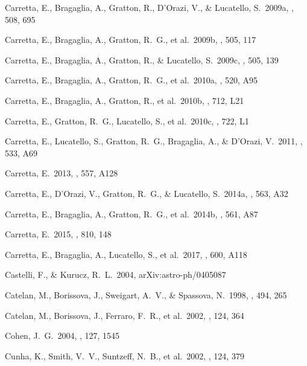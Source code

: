 \documentclass[12pt,preprint]{emulateapj}
\begin{document}
\begin{thebibliography}{}
 Carretta, E., Bragaglia, A., Gratton, R., D'Orazi, V., \& Lucatello, S.\ 2009a, \aap, 508, 695

 Carretta, E., Bragaglia, A., Gratton, R.~G., et al.\ 2009b, \aap, 505, 117

 Carretta, E., Bragaglia, A., Gratton, R., \& Lucatello, S.\ 2009c, \aap, 505, 139

 Carretta, E., Bragaglia, A., Gratton, R.~G., et al.\ 2010a, \aap, 520, A95

 Carretta, E., Bragaglia, A., Gratton, R., et al.\ 2010b, \apjl, 712, L21

 Carretta, E., Gratton, R.~G., Lucatello, S., et al.\ 2010c, \apjl, 722, L1 

 Carretta, E., Lucatello, S., Gratton, R.~G., Bragaglia, A., \& D'Orazi, V.\ 2011, \aap, 533, A69

 Carretta, E.\ 2013, \aap, 557, A128

 Carretta, E., D'Orazi, V., Gratton, R.~G., \& Lucatello, S.\ 2014a, \aap, 563, A32

 Carretta, E., Bragaglia, A., Gratton, R.~G., et al.\ 2014b, \aap, 561, A87

 Carretta, E.\ 2015, \apj, 810, 148

 Carretta, E., Bragaglia, A., Lucatello, S., et al.\ 2017, \aap, 600, A118

 Castelli, F., \& Kurucz, R.~L.\ 2004, arXiv:astro-ph/0405087

 Catelan, M., Borissova, J., Sweigart, A.~V., \& Spassova, N.\ 1998, \apj, 494, 265

 Catelan, M., Borissova, J., Ferraro, F.~R., et al.\ 2002, \aj, 124, 364

 Cohen, J.~G.\ 2004, \aj, 127, 1545

 Cunha, K., Smith, V.~V., Suntzeff, N.~B., et al.\ 2002, \aj, 124, 379


\end{thebibliography}
\end{document}

